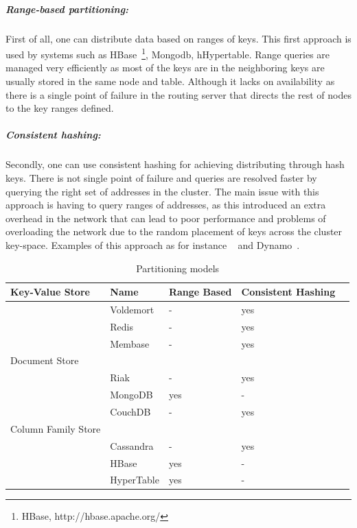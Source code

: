 	\subparagraph{Range-based partitioning:}
	First of all, one can distribute data based on ranges of keys. This first approach is used by systems such as HBase~\footnote{HBase, http://hbase.apache.org/}, Mongodb, hHypertable. Range queries are managed very efficiently as most of the keys are in the neighboring keys are usually stored in the same node  and table. Although it lacks on availability as there is a single point of failure in the routing server that directs the rest of nodes to the key ranges defined.
		
	\subparagraph{Consistent hashing:}
	Secondly, one can use consistent hashing for achieving distributing through hash keys. There is not single point of failure and queries are resolved faster by querying the right set of addresses in the cluster. The main issue with this approach is having to query ranges of addresses, as this introduced an extra overhead in the network that can lead to poor performance and problems of overloading the network due to the random placement of keys across the cluster key-space. Examples of this approach as for instance ~\cite{Lakshman:2010} and Dynamo~\cite{DeCandia:2007}.
	
\begin{table}[h]
		\begin{center}
    			\begin{tabular}{ | p{5cm} | l | l | l | l |}
   			\hline
			Key-Value Store & Name & Range Based & Consistent Hashing \\ \hline   		
			 & Voldemort & - & yes \\ \hline
			 & Redis & - & yes \\ \hline
			 & Membase & - & yes \\ \hline
			
			Document Store &  &  &  \\ \hline
			 & Riak & - & yes \\ \hline			
			 & MongoDB & yes & - \\ \hline
			 & CouchDB & - & yes \\ \hline
			Column Family Store &  & \\ \hline
			 & Cassandra & - & yes \\ \hline
			 & HBase & yes & - \\ \hline
			 & HyperTable & yes & - \\ \hline
    			\end{tabular}
		\end{center}
		\caption{Partitioning models}
		\label{table:partitioning}
		\end{table}	
	
